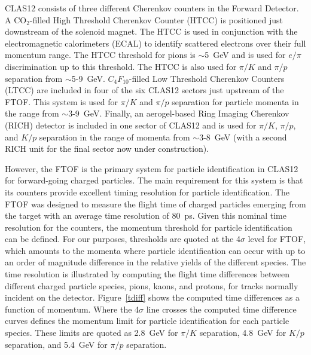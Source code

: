 \documentclass{elsart}
\begin{document}
CLAS12 consists of three different Cherenkov counters in the Forward Detector. A CO$_2$-filled
High Threshold Cherenkov Counter (HTCC) is positioned just downstream of the solenoid magnet. The
HTCC is used in conjunction with the electromagnetic calorimeters (ECAL) to identify scattered electrons
over their full momentum range. The HTCC threshold for pions is $\sim$5~GeV and is used for $e/\pi$
discrimination up to this threshold. The HTCC is also used for $\pi/K$ and $\pi/p$ separation from
$\sim$5-9~GeV. $C_4F_{10}$-filled Low Threshold Cherenkov Counters (LTCC) are included in four
of the six CLAS12 sectors just upstream of the FTOF. This system is used for $\pi/K$ and $\pi/p$
separation for particle momenta in the range from $\sim$3-9~GeV. Finally, an aerogel-based Ring Imaging
Cherenkov (RICH) detector is included in one sector of CLAS12 and is used for $\pi/K$, $\pi/p$, and $K/p$
separation in the range of momenta from $\sim$3-8~GeV (with a second RICH unit for the final sector now
under construction).

However, the FTOF is the primary system for particle identification in CLAS12 for forward-going charged
particles. The main requirement for this system is that its counters provide excellent timing resolution for
particle identification. The FTOF  was designed to measure the flight time of charged particles emerging
from the target with an average time resolution of 80~ps. Given this nominal time resolution for the
counters, the momentum threshold for particle identification can be defined. For our purposes, thresholds
are quoted at the 4$\sigma$ level for FTOF, which amounts to the momenta where particle identification
can occur with up to an order of magnitude difference in the relative yields of the different species. The
time resolution is illustrated by computing the flight time differences between different charged particle
species, pions, kaons, and protons, for tracks normally incident on the detector. Figure~\ref{tdiff} shows
the computed time differences as a function of momentum. Where the 4$\sigma$ line crosses the computed
time difference curves defines the momentum limit for particle identification for each particle species.
These limits are quoted as 2.8~GeV for $\pi/K$ separation, 4.8~GeV for $K/p$ separation, and 5.4~GeV
for $\pi/p$ separation.  
\end{document}
